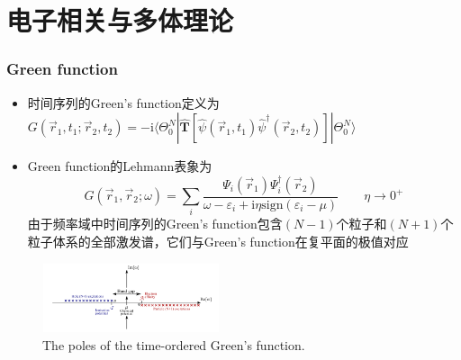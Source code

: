 \documentclass[cjk,slidestop,compress,mathserif,blue]{beamer}
\begin{document}
\section{电子相关与多体理论}
\frame
{
	\frametitle{\textrm{Green function}}
	\begin{itemize}
		\item 时间序列的\textrm{Green's function}定义为$G(\vec r_1,t_1;\vec r_2,t_2)=-\mathrm{i}\langle\Theta_0^N|\hat{\mathbf{T}}[\hat\psi(\vec r_1,t_1)\hat\psi^{\dag}(\vec r_2,t_2)]|\Theta_0^N\rangle$
		\item \textrm{Green function}的\textrm{Lehmann}表象为$$G(\vec r_1,\vec r_2;\omega)=\sum\limits_i\dfrac{\Psi_i(\vec r_1)\Psi_i^{\dag}(\vec r_2)}{\omega-\varepsilon_i+\mathrm{i}\eta\mathrm{sign}(\varepsilon_i-\mu)}\qquad\eta\rightarrow0^+$$
			由于频率域中时间序列的\textrm{Green's function}包含$(N-1)$个粒子和$(N+1)$个粒子体系的全部激发谱，它们与\textrm{Green's function}在复平面的极值对应
	\end{itemize}
\begin{figure}[h!]
\centering
\vspace{-5pt}
\includegraphics[height=0.80in,width=2.05in,viewport=30 1 660 265,clip]{Figures/GW-0.png}
\caption{\textrm{\small{The poles of the time-ordered Green's function.}}}%
\label{GW-0}
\end{figure}
}
\end{document}
